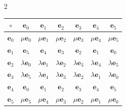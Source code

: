 \begin{multicols}{2}
\begin{center}
{\begin{tabular}{|c|c|c|c|c|c|c|}
$\circ$&$\mathbf{e}_0$&$\mathbf{e}_1$&$\mathbf{e}_2$&$\mathbf{e}_3$&


$\mathbf{e}_4$&$\mathbf{e}_5$\\


\hline


$\mathbf{e}_0$&$\mu \mathbf{e}_0$&$\mu \mathbf{e}_1$&


$\mu \mathbf{e}_2$&$\mu \mathbf{e}_3$&$\mu \mathbf{e}_4$&$\mu \mathbf{e}_5$\\


\hline


$\mathbf{e}_1$&$\mathbf{e}_5$&$\mathbf{e}_4$&$\mathbf{e}_3$&$\mathbf{e}_2$&


$\mathbf{e}_1$&$\mathbf{e}_0$\\


\hline


$\mathbf{e}_2$&$\lambda \mathbf{e}_0$&$\lambda \mathbf{e}_1$&$\lambda 


\mathbf{e}_2$&$\lambda \mathbf{e}_3$&$\lambda\mathbf{e}_4$&$\lambda 


\mathbf{e}_5$\\


\hline


$\mathbf{e}_3$&$\lambda\mathbf{e}_5$&$\lambda\mathbf{e}_4$&$\lambda\mathbf{e}_3


$&$\lambda\mathbf{e}_2$&$\lambda\mathbf{e}_1$&$\lambda \mathbf{e}_0$\\


\hline


$\mathbf{e}_4$&$\mathbf{e}_0$&$\mathbf{e}_1$&$\mathbf{e}_2$&$\mathbf{e}_3$&


$\mathbf{e}_4$&$\mathbf{e}_5$\\


\hline


$\mathbf{e}_5$&$\mu \mathbf{e}_5$&$\mu\mathbf{e}_4$&$\mu 


\mathbf{e}_3$&$\mu\mathbf{e}_2$&$\mu \mathbf{e}_1$&$\mu \mathbf{e}_0$\\


\hline


\end{tabular}


}




\end{center}





\vspace*{3pt}






\end{multicols}
